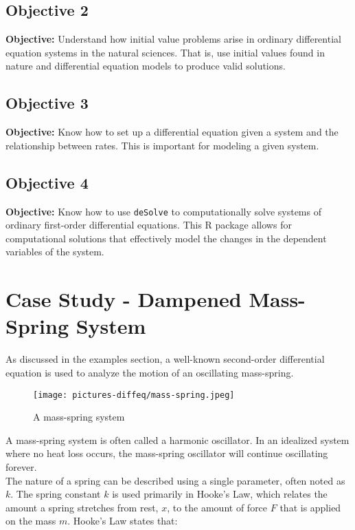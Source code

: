\subsection{Objective 2}
\textbf{Objective: } Understand how initial value problems arise in ordinary differential equation systems in the natural sciences. That is, use initial values found in nature and differential equation models to produce valid solutions.

\subsection{Objective 3}
\textbf{Objective: } Know how to set up a differential equation given a system and the relationship between rates. This is important for modeling a given system.

\subsection{Objective 4}
\textbf{Objective: } Know how to use \texttt{deSolve} to computationally solve systems of ordinary first-order differential equations. This R package allows for computational solutions that effectively model the changes in the dependent variables of the system.

\section{Case Study - Dampened Mass-Spring System}

As discussed in the examples section, a well-known second-order differential equation is used to analyze the motion of an oscillating mass-spring. 

\begin{figure}[H]
    \centering
    \texttt{[image: pictures-diffeq/mass-spring.jpeg]}
    \caption{A mass-spring system}
\end{figure}

A mass-spring system is often called a harmonic oscillator. In an idealized system where no heat loss occurs, the mass-spring oscillator will continue oscillating forever. \\

The nature of a spring can be described using a single parameter, often noted as $k$. The spring constant $k$ is used primarily in Hooke's Law, which relates the amount a spring stretches from rest, $x$, to the amount of force $F$ that is applied on the mass $m$. Hooke's Law states that:

